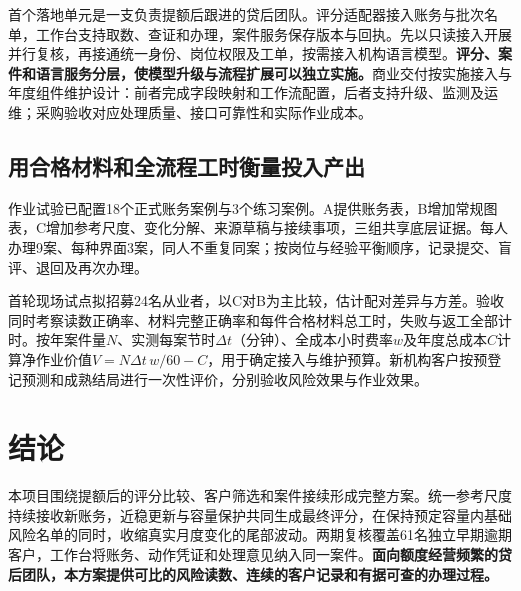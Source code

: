 \documentclass[a4paper,10pt]{article}
\begin{document}
首个落地单元是一支负责提额后跟进的贷后团队。评分适配器接入账务与批次名单，工作台支持取数、查证和办理，案件服务保存版本与回执。先以只读接入开展并行复核，再接通统一身份、岗位权限及工单，按需接入机构语言模型。\textbf{评分、案件和语言服务分层，使模型升级与流程扩展可以独立实施。}商业交付按实施接入与年度组件维护设计：前者完成字段映射和工作流配置，后者支持升级、监测及运维；采购验收对应处理质量、接口可靠性和实际作业成本。

\subsection{用合格材料和全流程工时衡量投入产出}
作业试验已配置18个正式账务案例与3个练习案例。A提供账务表，B增加常规图表，C增加参考尺度、变化分解、来源草稿与接续事项，三组共享底层证据。每人办理9案、每种界面3案，同人不重复同案；按岗位与经验平衡顺序，记录提交、盲评、退回及再次办理。

首轮现场试点拟招募24名从业者，以C对B为主比较，估计配对差异与方差。验收同时考察读数正确率、材料完整正确率和每件合格材料总工时，失败与返工全部计时。按年案件量$N$、实测每案节时$\Delta t$（分钟）、全成本小时费率$w$及年度总成本$C$计算净作业价值$V=N\Delta t\,w/60-C$，用于确定接入与维护预算。新机构客户按预登记预测和成熟结局进行一次性评价，分别验收风险效果与作业效果。

\section{结论}
本项目围绕提额后的评分比较、客户筛选和案件接续形成完整方案。统一参考尺度持续接收新账务，近稳更新与容量保护共同生成最终评分，在保持预定容量内基础风险名单的同时，收缩真实月度变化的尾部波动。两期复核覆盖61名独立早期逾期客户，工作台将账务、动作凭证和处理意见纳入同一案件。\textbf{面向额度经营频繁的贷后团队，本方案提供可比的风险读数、连续的客户记录和有据可查的办理过程。}
\label{bodyend}
\end{document}
